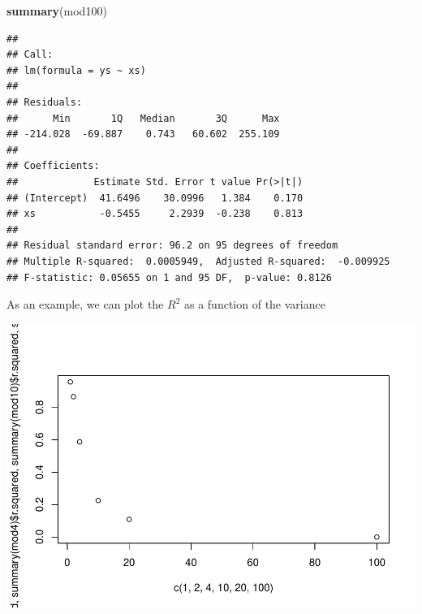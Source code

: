 \documentclass[
]{book}
\newenvironment{Shaded}{\begin{snugshade}}{\end{snugshade}}
\newcommand{\DecValTok}[1]{\textcolor[rgb]{0.00,0.00,0.81}{#1}}
\newcommand{\FunctionTok}[1]{\textcolor[rgb]{0.13,0.29,0.53}{\textbf{#1}}}
\newcommand{\NormalTok}[1]{#1}
\newcommand{\SpecialCharTok}[1]{\textcolor[rgb]{0.81,0.36,0.00}{\textbf{#1}}}
\begin{document}
\begin{Shaded}
\begin{Highlighting}[]
\FunctionTok{summary}\NormalTok{(mod100)}
\end{Highlighting}
\end{Shaded}

\begin{verbatim}
## 
## Call:
## lm(formula = ys ~ xs)
## 
## Residuals:
##      Min       1Q   Median       3Q      Max 
## -214.028  -69.887    0.743   60.602  255.109 
## 
## Coefficients:
##             Estimate Std. Error t value Pr(>|t|)
## (Intercept)  41.6496    30.0996   1.384    0.170
## xs           -0.5455     2.2939  -0.238    0.813
## 
## Residual standard error: 96.2 on 95 degrees of freedom
## Multiple R-squared:  0.0005949,  Adjusted R-squared:  -0.009925 
## F-statistic: 0.05655 on 1 and 95 DF,  p-value: 0.8126
\end{verbatim}

As an example, we can plot the \(R^2\) as a function of the variance

\begin{Shaded}
\end{Shaded}

\includegraphics{ECOMODbook_files/figure-latex/a6.30-1.pdf}
\end{document}

